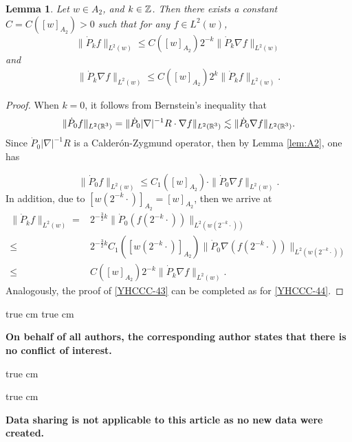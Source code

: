 \documentclass[11pt,twoside]{article}
\def\Z{\mathop{\mathbb Z\kern 0pt}\nolimits}
\def\R{\mathop{\mathbb R\kern 0pt}\nolimits}
\def\f{\frac}
\def\ls{\lesssim}
\newcommand{\pk}{\dot{P}_k}
\newcommand{\Ltw}[1]{\|#1\|_{L^2(w)}}
\newcommand{\Atwo}[1]{[#1]_{A_2}}
\theoremstyle{plain}
\newtheorem{lemma}[theorem]{Lemma}
\theoremstyle{definition}
\numberwithin{equation}{section}
\begin{document}
\begin{lemma}\label{lem:weighted bernstein}
	Let $w \in A_2$, and $k\in \Z$. Then there exists a constant $C = C (\Atwo{w})> 0$ such that for any $f \in L^2(w)$,
	\[
	\Ltw{\pk f} \leq C (\Atwo{w}) 2^{-k}\Ltw{\pk \nabla f}
	\]
	and
	\begin{equation}\label{YHCCC-43}
	\begin{split}
	\Ltw{\pk \nabla f} \leq C (\Atwo{w}) 2^{k}\Ltw{\pk f}.
	\end{split}
	\end{equation}
\end{lemma}
\begin{proof}
	When $k=0$, it follows from Bernstein's inequality that
	\begin{equation*}
		\|\dot{P}_0 f\|_{L^2(\R^3)}=\|\dot{P}_0 |\nabla|^{-1}R\cdot\nabla f\|_{L^2(\R^3)}\ls  \|\dot{P}_0\nabla f\|_{L^2(\R^3)}.
	\end{equation*}
Since $\dot{P}_0|\nabla|^{-1}R$ is a Calder\'{o}n-Zygmund operator, then by Lemma \ref{lem:A2}, one has

	\[
	\Ltw{\dot{P}_0 f} \leq C_1(\Atwo{w}) \cdot \Ltw{\dot{P}_0 \nabla f}.
	\]
In addition, due to $\Atwo{w(2^{-k}\cdot)}=\Atwo{w}$, then we arrive at
	\begin{equation}\label{YHCCC-44}
	\begin{split}
		\Ltw{\pk f}  = &2^{-\f32 k}\|\dot{P}_0(f(2^{-k}\cdot))\|_{L^2(w(2^{-k}\cdot))}\\
		\le& 2^{-\f32 k}C_1(\Atwo{w(2^{-k}\cdot)})\|\dot{P}_0\nabla(f(2^{-k}\cdot))\|_{L^2(w(2^{-k}\cdot))}\\
		\le& C (\Atwo{w}) 2^{-k}\Ltw{\pk \nabla f}.
	\end{split}
	\end{equation}
Analogously, the proof of \eqref{YHCCC-43} can be completed as for \eqref{YHCCC-44}.
\end{proof}








 true cm
{\bf \color{blue}{Conflict of interest}}
 true cm

{\bf On behalf of all authors, the corresponding author states that there is no conflict of interest.}

 true cm


{\bf \color{blue}{Data availability}}

 true cm

{\bf Data sharing is not applicable to this article as no new data were created.}
\end{document}

